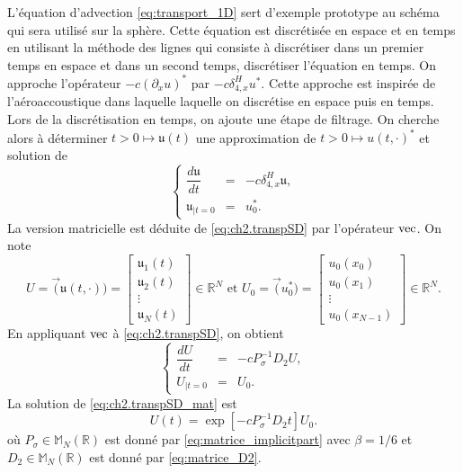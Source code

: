 L'équation d'advection \eqref{eq:transport_1D} sert d'exemple prototype au schéma qui sera utilisé sur la sphère. Cette équation est discrétisée en espace et en temps en utilisant la méthode des lignes qui consiste à discrétiser dans un premier temps en espace et dans un second temps, discrétiser l'équation en temps. On approche l'opérateur $-c (\partial_x u)^*$ par $- c \delta_{4,x}^H u^*$. Cette approche est inspirée de l'aéroaccoustique dans laquelle laquelle on discrétise en espace puis en temps. Lors de la discrétisation en temps, on ajoute une étape de filtrage.
On cherche alors à déterminer $t > 0 \mapsto \mathfrak{u}(t)$ une approximation de $t>0  \mapsto u(t,\cdot)^*$ et solution de 
\begin{equation}
\left\lbrace
\begin{array}{rcl}
\dfrac{d \mathfrak{u}}{dt} & = & - c \delta_{4,x}^H \mathfrak{u}, \\
\mathfrak{u}_{|t=0} & = & u_0^*.
\end{array}
\right.
\label{eq:ch2.transpSD}
\end{equation}
La version matricielle est déduite de \eqref{eq:ch2.transpSD} par l'opérateur $\vec$. On note
\begin{equation}
U = \vec (\mathfrak{u}(t,\cdot)) = \begin{bmatrix}
\mathfrak{u}_1(t) \\
\mathfrak{u}_2(t) \\
\vdots \\
\mathfrak{u}_N(t)
\end{bmatrix} \in \mathbb{R}^N \text{ et } U_0 = \vec (u^*_0 ) = \begin{bmatrix}
u_0(x_0) \\
u_0(x_1) \\
\vdots \\
u_0(x_{N-1})
\end{bmatrix} \in \mathbb{R}^N.
\end{equation}
En appliquant $\vec$ à \eqref{eq:ch2.transpSD}, on obtient
\begin{equation}
\left\lbrace
\begin{array}{rcl}
\dfrac{d U}{dt} & = & - c P^{-1}_{\sigma} D_2 U, \\
U_{|t=0} & = & U_0.
\end{array}
\right.
\label{eq:ch2.transpSD_mat}
\end{equation}
La solution de \eqref{eq:ch2.transpSD_mat} est
\begin{equation}
U(t) = \exp\left[ - c P^{-1}_{\sigma} D_2 t\right] U_0.
\label{eq:u(t)matriciel_transp}
\end{equation}
où $P_{\sigma} \in \mathbb{M}_N(\mathbb{R})$ est donné par \eqref{eq:matrice_implicitpart} avec $\beta = 1/6$ et $D_2 \in \mathbb{M}_N(\mathbb{R})$ est donné par \eqref{eq:matrice_D2}.

